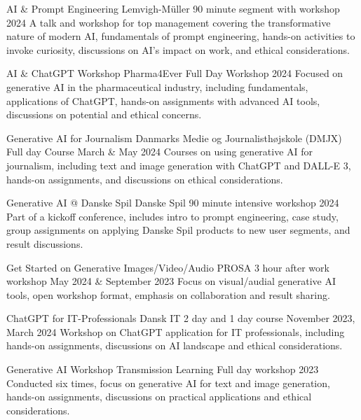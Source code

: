 

\begin{cventries}

\cventry
{AI \& Prompt Engineering} %
{Lemvigh-Müller} %
{90 minute segment with workshop} %
{2024} %
{
  A talk and workshop for top management covering the transformative nature of modern AI, fundamentals of prompt engineering, hands-on activities to invoke curiosity, discussions on AI's impact on work, and ethical considerations.
}

\cventry
{AI \& ChatGPT Workshop} %
{Pharma4Ever} %
{Full Day Workshop} %
{2024} %
{
  Focused on generative AI in the pharmaceutical industry, including fundamentals, applications of ChatGPT, hands-on assignments with advanced AI tools, discussions on potential and ethical concerns.
}

\cventry
{Generative AI for Journalism} %
{Danmarks Medie og Journalisthøjskole (DMJX)} %
{Full day Course} %
{March \& May 2024} %
{
  Courses on using generative AI for journalism, including text and image generation with ChatGPT and DALL-E 3, hands-on assignments, and discussions on ethical considerations.
}

\cventry
{Generative AI @ Danske Spil} %
{Danske Spil} %
{90 minute intensive workshop} %
{2024} %
{
  Part of a kickoff conference, includes intro to prompt engineering, case study, group assignments on applying Danske Spil products to new user segments, and result discussions.
}

\cventry
{Get Started on Generative Images/Video/Audio} %
{PROSA} %
{3 hour after work workshop} %
{May 2024 \& September 2023} %
{
  Focus on visual/audial generative AI tools, open workshop format, emphasis on collaboration and result sharing.
}

\cventry
{ChatGPT for IT-Professionals} %
{Dansk IT} %
{2 day and 1 day course} %
{November 2023, March 2024} %
{
  Workshop on ChatGPT application for IT professionals, including hands-on assignments, discussions on AI landscape and ethical considerations.
}

\cventry
{Generative AI Workshop} %
{Transmission Learning} %
{Full day workshop} %
{2023} %
{
  Conducted six times, focus on generative AI for text and image generation, hands-on assignments, discussions on practical applications and ethical considerations.
}


\end{cventries}